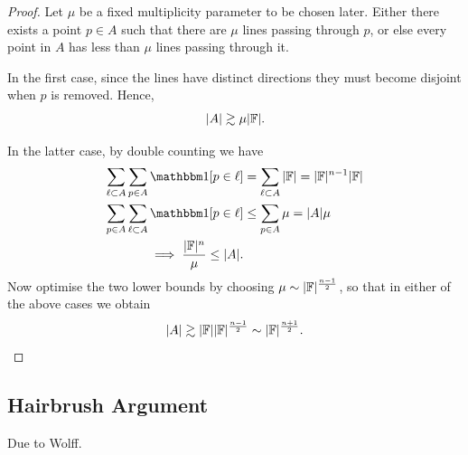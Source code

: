 \begin{proof}
    Let $\mu$ be a fixed multiplicity parameter to be chosen later. Either there exists a point $p\in A$ such that there are $\mu$ lines passing through $p$,
    or else every point in $A$ has less than $\mu$ lines passing through it.

    In the first case, since the lines have distinct directions they must become disjoint when $p$ is removed. Hence,
    \[
      |A| \gtrsim \mu |\mathbb F| .
    \]

    In the latter case, by double counting we have
    \begin{align*}
         \sum_{\ell \subset A} \sum_{p \in A} \OO[p \in \ell] &= \sum_{\ell \subset A} |\FF| = |\FF|^{n-1} |\FF| \\
        \sum_{p \in A} \sum_{\ell \subset A} \OO[p \in \ell] &\leq \sum_{p \in A} \mu = |A|\mu \\
        \implies \frac{|\FF|^{n}}{\mu} \leq |A|.
    \end{align*}
    Now optimise the two lower bounds by choosing $\mu \sim |\mathbb F|^{\frac{n-1}{2}}$, so that in either of the above cases we obtain
    \[
        |A| \gtrsim |\mathbb F||\mathbb F|^{\frac{n-1}{2}} \sim |\mathbb F|^{\frac{n+1}{2}}.
    \]

\end{proof}

\subsection{Hairbrush Argument}
Due to Wolff. \cite{WOLFF1995}

